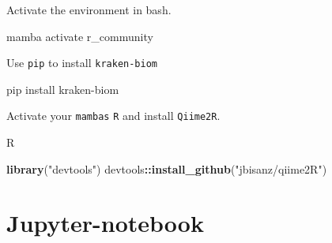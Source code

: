 \documentclass[
]{book}
\newenvironment{Shaded}{\begin{snugshade}}{\end{snugshade}}
\newcommand{\ExtensionTok}[1]{#1}
\newcommand{\FunctionTok}[1]{\textcolor[rgb]{0.13,0.29,0.53}{\textbf{#1}}}
\newcommand{\NormalTok}[1]{#1}
\newcommand{\SpecialCharTok}[1]{\textcolor[rgb]{0.81,0.36,0.00}{\textbf{#1}}}
\newcommand{\StringTok}[1]{\textcolor[rgb]{0.31,0.60,0.02}{#1}}
\begin{document}
Activate the environment in bash.

\begin{Shaded}
\begin{Highlighting}[]
\ExtensionTok{mamba}\NormalTok{ activate r\_community}
\end{Highlighting}
\end{Shaded}

Use \texttt{pip} to install \texttt{kraken-biom}

\begin{Shaded}
\begin{Highlighting}[]
\ExtensionTok{pip}\NormalTok{ install kraken{-}biom}
\end{Highlighting}
\end{Shaded}

Activate your \texttt{mamba\textquotesingle{}s} \texttt{R} and install \texttt{Qiime2R}.

\begin{Shaded}
\begin{Highlighting}[]
\ExtensionTok{R}
\end{Highlighting}
\end{Shaded}

\begin{Shaded}
\begin{Highlighting}[]
\FunctionTok{library}\NormalTok{(}\StringTok{"devtools"}\NormalTok{)}
\NormalTok{devtools}\SpecialCharTok{::}\FunctionTok{install\_github}\NormalTok{(}\StringTok{"jbisanz/qiime2R"}\NormalTok{)}
\end{Highlighting}
\end{Shaded}

\hypertarget{jupyter_appendix}{%
\section{Jupyter-notebook}\label{jupyter_appendix}}
\end{document}
